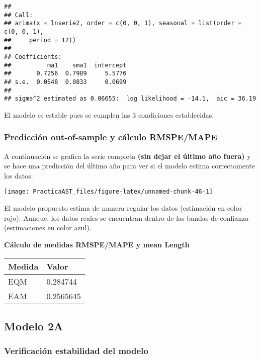 \documentclass[
]{article}
\begin{document}
\begin{verbatim}
## 
## Call:
## arima(x = lnserie2, order = c(0, 0, 1), seasonal = list(order = c(0, 0, 1), 
##     period = 12))
## 
## Coefficients:
##          ma1    sma1  intercept
##       0.7256  0.7989     5.5776
## s.e.  0.0548  0.0833     0.0699
## 
## sigma^2 estimated as 0.06655:  log likelihood = -14.1,  aic = 36.19
\end{verbatim}

El modelo es estable pues se cumplen las 3 condiciones establecidas.

\medskip

\hypertarget{predicciuxf3n-out-of-sample-y-cuxe1lculo-rmspemape}{%
\subsubsection{Predicción out-of-sample y cálculo
RMSPE/MAPE}\label{predicciuxf3n-out-of-sample-y-cuxe1lculo-rmspemape}}

A continuación se grafica la serie completa \textbf{(sin dejar el último
año fuera)} y se hace una predicción del último año para ver si el
modelo estima correctamente los datos.

\begin{center}\texttt{[image: PracticaAST\_files/figure-latex/unnamed-chunk-46-1]} \end{center}

El modelo propuesto estima de manera regular los datos (estimación en
color rojo). Aunque, los datos reales se encuentran dentro de las bandas
de confianza (estimaciones en color azul).

\medskip

\textbf{Cálculo de medidas RMSPE/MAPE y mean Length}

\begin{longtable}[]{@{}ll@{}}
\toprule()
Medida & Valor \\
\midrule()
\endhead
EQM & 0.284744 \\
EAM & 0.2565645 \\
\bottomrule()
\end{longtable}

\medskip

\hypertarget{modelo-2a}{%
\subsection{Modelo 2A}\label{modelo-2a}}

\hypertarget{verificaciuxf3n-estabilidad-del-modelo-1}{%
\subsubsection{Verificación estabilidad del
modelo}\label{verificaciuxf3n-estabilidad-del-modelo-1}}
\end{document}
